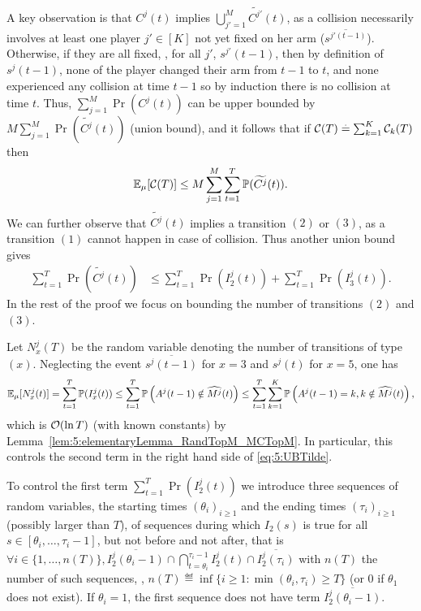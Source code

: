 \begin{smallproof}
  A key observation is that $C^j(t)$ implies $\bigcup_{j'=1}^M \widetilde{C^{j'}}(t)$, as a collision necessarily involves at least one player $j'\in[K]$ not yet fixed on her arm ($\overline{s^{j'(t-1)}}$).
  Otherwise, if they are all fixed, \ie, for all $j'$, $s^{j'}(t-1)$, then by definition of $s^j(t-1)$, none of the player changed their arm from $t-1$ to $t$, and none experienced any collision at time $t-1$ so by induction there is no collision at time $t$.
  Thus, $\sum_{j=1}^M \Pr(C^j(t))$ can be upper bounded by $M \sum_{j=1}^M \Pr(\widetilde{C^j}(t))$ (union bound),
  and it follows that if $\mathcal{C}(T) \overset{.}{=} \sum_{k=1}^K \mathcal{C}_k(T)$ then
  \[\mathbb{E}_{\mu}[\mathcal{C}(T)] \leq M \sum_{j=1}^M \sum_{t=1}^T \mathbb{P}(\widetilde{C^j}(t)).\]
  We can further  observe that $\widetilde{C^j}(t)$ implies a transition $(2)$ or $(3)$, as a transition $(1)$ cannot happen in case of collision. Thus another union bound gives
  \begin{align}
    \sum_{t=1}^T \Pr(\widetilde{C^j}(t))
    &\leq \sum_{t=1}^T \Pr(I_2^j(t)) + \sum_{t=1}^T \Pr(I_3^j(t)).\label{eq:5:UBTilde}
  \end{align}
  In the rest of the proof we focus on bounding the number of transitions $(2)$ and $(3)$.


  Let $N_x^j(T)$ be the random variable denoting the number of transitions of type $(x)$.
  Neglecting the event $\overline{s^j(t-1)}$ for $x=3$ and $s^j(t)$ for $x=5$, one has
  \begin{equation}
      \mathbb{E}_{\mu}[N_x^j(t)]
      = \sum_{t=1}^T \mathbb{P}(I_x^j(t))
      \leq \sum_{t=1}^T \mathbb{P} \left(A^j(t-1) \notin \widehat{M^j}(t)\right)
      \leq \sum_{t=1}^T \sum_{k=1}^K \mathbb{P} \left(A^j(t-1)=k, k \notin \widehat{M^j}(t)\right),
  \end{equation}
  which is $\mathop{}\mathopen{}\mathcal{O}\mathopen{}\left(\ln T\right)$ (with known constants) by Lemma~\ref{lem:5:elementaryLemma_RandTopM_MCTopM}. In particular, this controls the second term in the right hand side of \eqref{eq:5:UBTilde}.

  To control the first term $\sum_{t=1}^T \Pr(I_2^j(t))$
  we introduce three sequences of random variables,
  the starting times $(\theta_i)_{i \geq 1}$
  and the ending times $(\tau_i)_{i \geq 1}$
  (possibly larger than $T$),
  of sequences during which $I_2(s)$ is true for all $s \in [\theta_i,\dots,\tau_i-1]$, but not before and not after,
  that is
  $\forall i \in \{1,\dots,n(T)\},
  \overline{I_2^j(\theta_i - 1)}
  \cap \bigcap_{t=\theta_i}^{\tau_i-1} I_2^j(t)
  \cap \overline{I_2^j(\tau_i)}
  $
  with $n(T)$ the number of such sequences,
  \ie,
  $n(T) \eqdef \inf \{i \geq 1 : \min(\theta_i, \tau_i) \geq T \}$
  (or $0$ if $\theta_1$ does not exist).
  If $\theta_i = 1$, the first sequence does not have term $\overline{I_2^j(\theta_i - 1)}$.


\end{smallproof}
